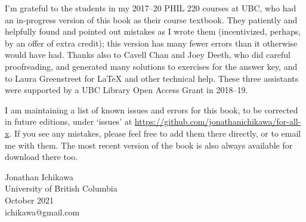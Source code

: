 I'm grateful to the students in my 2017--20 PHIL 220 courses at UBC, who had an in-progress version of this book as their course textbook. They patiently and helpfully found and pointed out mistakes as I wrote them (incentivized, perhaps, by an offer of extra credit); this version has many fewer errors than it otherwise would have had. Thanks also to Cavell Chan and Joey Deeth, who did careful proofreading, and generated many solutions to exercises for the answer key, and to Laura Greenstreet for LaTeX and other technical help. These three assistants were supported by a UBC Library Open Access Grant in 2018--19.

I am maintaining a list of known issues and errors for this book, to be corrected in future editions, under `issues' at \url{https://github.com/jonathanichikawa/for-all-x}. If you see any mistakes, please feel free to add them there directly, or to email me with them. The most recent version of the book is also always available for download there too.

\begin{flushright}
Jonathan Ichikawa \\
University of British Columbia \\
October 2021 \\
ichikawa@gmail.com
\end{flushright}
